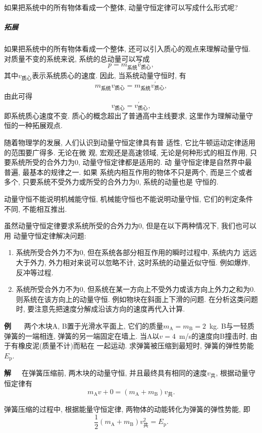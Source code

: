 \documentclass[11pt,a4paper]{ctexbook}
\newcounter{exam}[chapter]
\newcommand{\bre}{\ \ \ }
\newcommand{\examlabel}{\textbf{例\theexam}}
\newenvironment{example}{\bigskip\par\refstepcounter{exam}\examlabel\bre}{\par}
\begin{document}
{\kaishu 如果把系统中的所有物体看成一个整体, 动量守恒定律可以写成什么形式呢?}

\subparagraph{拓展} 如果把系统中的所有物体看成一个整体, 还可以引入质心的观点来理解动量守恒. 对质量不变的系统来说, 系统的总动量可以写成
$$p = m_\text{系统}v_\text{质心},$$
其中$v_\text{质心}$表示系统质心的速度. 因此, 当系统动量守恒时, 有
$$m_\text{系统}v_\text{质心} = m_\text{系统}v_\text{质心}^{\prime},$$
由此可得
$$v_\text{质心} = v_\text{质心}^{\prime},$$
即系统质心速度不变. 质心的概念超出了普通高中主线要求, 这里作为理解动量守恒的一种拓展观点.

随着物理学的发展, 人们认识到动量守恒定律具有普
适性, 它比牛顿运动定律适用的范围要广得多. 无论在微
观, 宏观还是高速领域, 无论是何种形式的相互作用, 只
要系统所受的合外力为0, 动量守恒定律都是适用的. 动
量守恒定律是自然界中最普遍, 最基本的规律之一. 如果
系统内相互作用的物体不只是两个, 而是三个或者多个,
只要系统不受外力或所受的合外力为0, 系统的动量也是
守恒的.

动量守恒不能说明机械能守恒, 机械能守恒也不能说明动量守恒,
它们的判定条件不同, 不能相互推出.

虽然动量守恒定律要求系统所受的合外力为0, 但是在以下两种情况下, 我们也可以用
动量守恒定律解决问题:
\begin{enumerate}
    \item 系统所受合外力不为0, 但在系统各部分相互作用的瞬时过程中, 系统内力
          远远大于外力, 外力相对来说可以忽略不计, 这时系统的动量近似守恒. 例如爆炸, 反冲等过程.
    \item 系统所受合外力不为0, 但系统在某一方向上不受外力或该方向上外力之和为0.
          则系统在该方向上的动量守恒. 例如物块在斜面上下滑的问题. 在分析这类问题时, 要注意先把速度分解成沿该方向的速度再代入计算.
\end{enumerate}

\begin{example}
    两个木块A, B置于光滑水平面上, 它们的质量$m_\mathrm{A} = m_\mathrm{B} = 2$\ kg.
B与一轻质弹簧的一端相连,
弹簧的另一端固定在墙上. 当A以$v = 4$\ m/s的速度向B撞击时, 由于有橡皮泥(质量不计)而粘在
一起运动. 求弹簧被压缩到最短时, 弹簧的弹性势能$E_\mathrm{p}$.
\end{example}

\textbf{解}\bre 在弹簧压缩前, 两木块的动量守恒, 并且最终具有相同的速度$v_\text{共}$,
根据动量守恒定律有$$m_\mathrm{A}v + 0 = (m_\mathrm{A}+m_\mathrm{B})v_\text{共}.$$

弹簧压缩的过程中, 根据能量守恒定律, 两物体的动能转化为弹簧的弹性势能, 即
$$\frac12 (m_\mathrm{A}+m_\mathrm{B}) v_\text{共}^2 = E_\mathrm{p}.$$
\end{document}
